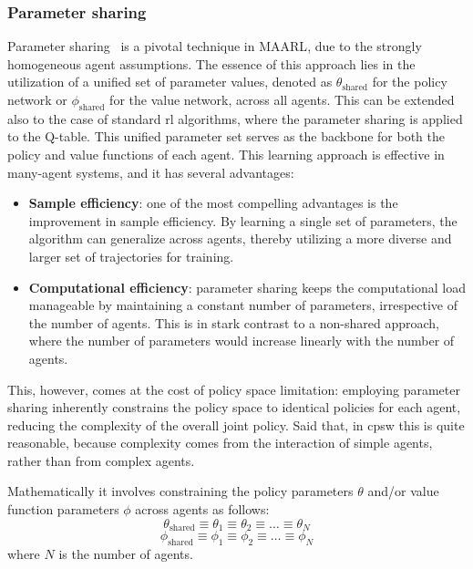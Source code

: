 \subsubsection*{Parameter sharing}
Parameter sharing~\cite{albrecht2023multi} is a pivotal technique in \ac{MAARL}, 
 due to the strongly homogeneous agent assumptions. 
% 
The essence of this approach lies in the utilization of a unified set of parameter values, 
 denoted as \( \theta_{\text{shared}} \) for the policy network or \( \phi_{\text{shared}} \) 
 for the value network, across all agents.
 This can be extended also to the case of standard \ac{rl} algorithms, 
 where the parameter sharing is applied to the Q-table. 
This unified parameter set serves as the backbone for both the policy and value functions of each agent.
This learning approach is effective in many-agent systems, and it has several advantages:
\begin{itemize}
  \item \textbf{Sample efficiency}: 
  one of the most compelling advantages is the improvement in sample efficiency. 
  By learning a single set of parameters, 
  the algorithm can generalize across agents, 
  thereby utilizing a more diverse and larger set of trajectories for training.
  \item \textbf{Computational efficiency}: 
  parameter sharing keeps the computational load manageable by maintaining a constant number of parameters, 
  irrespective of the number of agents. 
  This is in stark contrast to a non-shared approach, 
  where the number of parameters would increase linearly with the number of agents.
\end{itemize}
This, however, comes at the cost of policy space limitation: employing parameter sharing inherently constrains the policy space to identical policies for each agent, 
 reducing the complexity of the overall joint policy.
 Said that, in \ac{cpsw} this is quite reasonable,
 because complexity comes from the interaction of simple agents,
  rather than from complex agents.
 
Mathematically it involves constraining the policy parameters \( \theta \) and/or value function parameters \( \phi \) across agents as follows:
\[
\theta_{\text{shared}} \equiv \theta_1 \equiv \theta_2 \equiv \ldots \equiv \theta_N
\]
\[
\phi_{\text{shared}} \equiv \phi_1 \equiv \phi_2 \equiv \ldots \equiv \phi_N
\]
where \( N \) is the number of agents.

